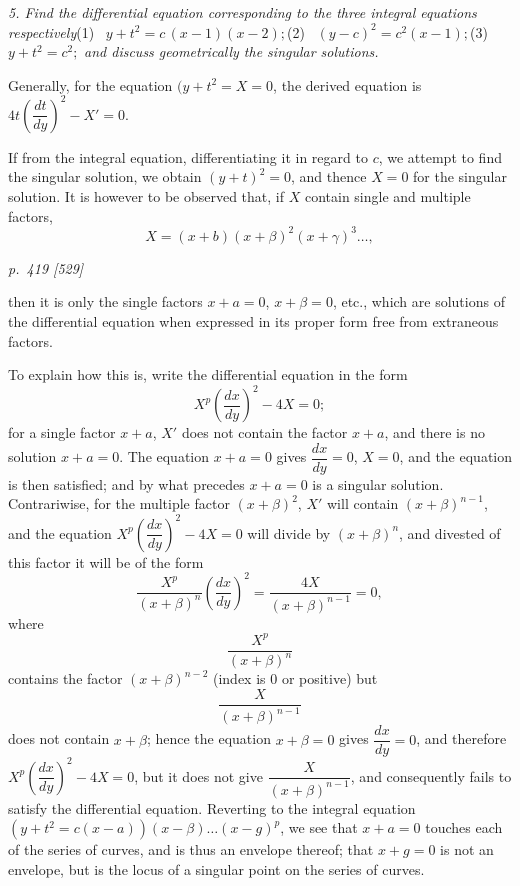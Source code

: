 \documentclass[11pt,a4paper]{article}
\theoremstyle{plain}
\theoremstyle{definition}
\begin{document}
\textit{5. Find the differential equation corresponding to the three integral equations respectively}\quad (1) \ $y + t^2 = c\,(x - 1)(x - 2);$\quad (2) \ $(y - c)^2 = c^2(x - 1);$\quad {}\quad (3) \ $y + t^2 = c^2;$
\textit{and discuss geometrically the singular solutions.}

Generally, for the equation $(y + t^2 = X = 0$, the derived equation is $4t\left(\dfrac{dt}{dy}\right)^2 - X' = 0$.

If from the integral equation, differentiating it in regard to $c$, we attempt to find the singular solution, we obtain $(y + t)^2 = 0$, and thence $X = 0$ for the singular solution. It is however to be observed that, if $X$ contain single and multiple factors,
\[
X = (x + b)(x + \beta)^2 (x + \gamma)^3 \ldots ,
\]

\clearpage

\bigskip
\textit{p.~419 [529]}
\smallskip

then it is only the single factors $x + a = 0$, $x + \beta = 0$, etc., which are solutions of the differential equation when expressed in its proper form free from extraneous factors.

To explain how this is, write the differential equation in the form
\[
X^p \left(\frac{dx}{dy}\right)^2 - 4X = 0;
\]
for a single factor $x + a$, $X'$ does not contain the factor $x + a$, and there is no solution $x + a = 0$. The equation $x + a = 0$ gives $\dfrac{dx}{dy} = 0$, $X = 0$, and the equation is then satisfied; and by what precedes $x + a = 0$ is a singular solution. Contrariwise, for the multiple factor $(x + \beta)^2$, $X'$ will contain $(x + \beta)^{n-1}$, and the equation $X^p\left(\dfrac{dx}{dy}\right)^2 - 4X = 0$ will divide by $(x + \beta)^n$, and divested of this factor it will be of the form
\[
\frac{X^p}{(x + \beta)^n}\left(\frac{dx}{dy}\right)^2 = \frac{4X}{(x + \beta)^{n-1}} = 0,
\]
where
\[
\frac{X^p}{(x + \beta)^n}
\]
contains the factor $(x + \beta)^{n-2}$ (index is 0 or positive) but
\[
\frac{X}{(x + \beta)^{n-1}}
\]
does not contain $x + \beta$; hence the equation $x + \beta = 0$ gives $\dfrac{dx}{dy} = 0$, and therefore $X^p\left(\dfrac{dx}{dy}\right)^2 - 4X = 0$, but it does not give $\dfrac{X}{(x + \beta)^{n-1}}$, and consequently fails to satisfy the differential equation. Reverting to the integral equation $(y + t^2 = c(x - a))(x - \beta)\ldots (x - g)^p$, we see that $x + a = 0$ touches each of the series of curves, and is thus an envelope thereof; that $x + g = 0$ is not an envelope, but is the locus of a singular point on the series of curves.
\end{document}
